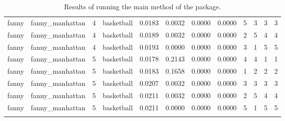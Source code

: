 {\begin{longtable}{| p{1cm} | p{1.8cm} | p{0.7cm} | p{0.9cm} | p{0.5cm} | p{0.65cm} | p{0.5cm} | p{0.5cm} | p{0.55cm} | p{0.55cm} | p{0.6cm} | p{0.5cm} |}
\scriptsize   fanny   & \scriptsize  fanny\_manhattan & \scriptsize    4    & \scriptsize basketball & \scriptsize    0.0183  &  \scriptsize 0.0032 & \scriptsize 0.0000 & \scriptsize    0.0000 & \scriptsize   5  & \scriptsize    3  & \scriptsize    3  & \scriptsize    3 \\
\scriptsize   fanny   & \scriptsize  fanny\_manhattan & \scriptsize    4    & \scriptsize basketball & \scriptsize    0.0189  &  \scriptsize 0.0032 & \scriptsize 0.0000 & \scriptsize    0.0000 & \scriptsize   2  & \scriptsize    5  & \scriptsize    4  & \scriptsize    4 \\
\scriptsize   fanny   & \scriptsize  fanny\_manhattan & \scriptsize    4    & \scriptsize basketball & \scriptsize    0.0193  &  \scriptsize 0.0000 & \scriptsize 0.0000 & \scriptsize    0.0000 & \scriptsize   3  & \scriptsize    1  & \scriptsize    5  & \scriptsize    5 \\
\cline{3-12}
\scriptsize   fanny   & \scriptsize  fanny\_manhattan & \scriptsize    5    & \scriptsize basketball & \scriptsize    0.0178  &  \scriptsize 0.2143 & \scriptsize 0.0000 & \scriptsize    0.0000 & \scriptsize   4  & \scriptsize    4  & \scriptsize    1  & \scriptsize    1 \\
\scriptsize   fanny   & \scriptsize  fanny\_manhattan & \scriptsize    5    & \scriptsize basketball & \scriptsize    0.0183  &  \scriptsize 0.1658 & \scriptsize 0.0000 & \scriptsize    0.0000 & \scriptsize   1  & \scriptsize    2  & \scriptsize    2  & \scriptsize    2 \\
\scriptsize   fanny   & \scriptsize  fanny\_manhattan & \scriptsize    5    & \scriptsize basketball & \scriptsize    0.0207  &  \scriptsize 0.0032 & \scriptsize 0.0000 & \scriptsize    0.0000 & \scriptsize   3  & \scriptsize    3  & \scriptsize    3  & \scriptsize    3 \\
\scriptsize   fanny   & \scriptsize  fanny\_manhattan & \scriptsize    5    & \scriptsize basketball & \scriptsize    0.0211  &  \scriptsize 0.0032 & \scriptsize 0.0000 & \scriptsize    0.0000 & \scriptsize   2  & \scriptsize    5  & \scriptsize    4  & \scriptsize    4 \\
\scriptsize   fanny   & \scriptsize  fanny\_manhattan & \scriptsize    5    & \scriptsize basketball & \scriptsize    0.0211  &  \scriptsize 0.0000 & \scriptsize 0.0000 & \scriptsize    0.0000 & \scriptsize   5  & \scriptsize    1  & \scriptsize    5  & \scriptsize    5 \\
\hline
\caption{Results of running the main method of the package.}
\label{tab:clustering}
\end{longtable}}

